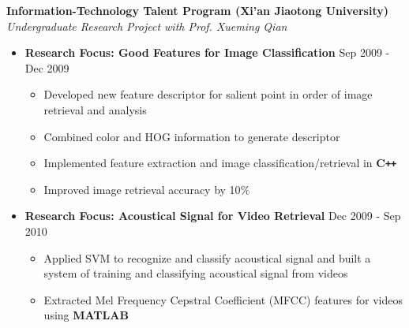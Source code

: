 \documentclass[10pt]{article}
\newenvironment{outerlist}[1][\enskip\textbullet]%
        {\begin{itemize}[#1,leftmargin=*]}{\end{itemize}%
         \vspace{-1.2\baselineskip}}
\newenvironment{innerlist}[1][\enskip\textbullet]%
        {\begin{itemize}[#1,leftmargin=*,parsep=0pt,itemsep=0pt,topsep=0pt,partopsep=0pt]}
        {\end{itemize}}
\begin{document}
\textbf{Information-Technology Talent Program (Xi'an Jiaotong University) } \\
\emph{Undergraduate Research Project with Prof. Xueming Qian}
\begin{outerlist}
\vspace{-.1in}
\item[] \textbf{Research Focus: Good Features for Image Classification } \hfill {Sep 2009 - Dec  2009}
        \begin{innerlist}
\vspace{-.05in}
        \item Developed new feature descriptor for salient point in order of image retrieval and analysis
	\item Combined color and HOG information to generate descriptor
	\item Implemented feature extraction and image classification/retrieval in \textbf{C\texttt{++}}
	\item Improved image retrieval accuracy by 10$\%$
        \end{innerlist}
        \item[] \textbf{Research Focus: Acoustical Signal for Video Retrieval } \hfill {Dec 2009 - Sep 2010}
        \begin{innerlist}
\vspace{-.05in}
        \item Applied SVM to recognize and classify acoustical signal and built a system of training and classifying acoustical signal from videos
        \item Extracted Mel Frequency Cepstral Coefficient (MFCC) features for videos using \textbf{MATLAB}
        \end{innerlist}
\vspace{.25in}
\end{outerlist}
\end{document}

